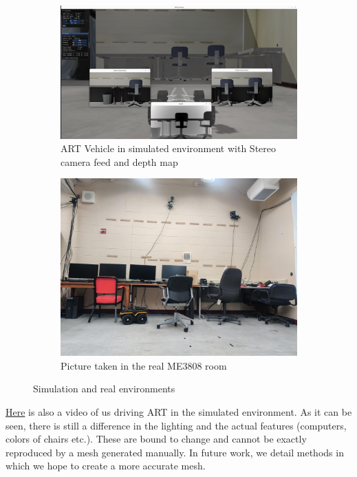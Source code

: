 \documentclass{article}
\begin{document}
\begin{figure}[htbp]
    \centering
    \begin{subfigure}[b]{0.45\textwidth}
      \centering
      \includegraphics[width=\linewidth]{./images/sim.png}
      \caption{ART Vehicle in simulated environment with Stereo camera feed and depth map}
      \label{fig:sim}
    \end{subfigure}
    \hfill
    \begin{subfigure}[b]{0.45\textwidth}
      \centering
      \includegraphics[width=\linewidth]{./images/real.jpeg}
      \caption{Picture taken in the real ME3808 room}
      \label{fig:real}
    \end{subfigure}
    \caption{Simulation and real environments}
    \label{fig:sim2real}
  \end{figure}

\href{https://uwmadison.box.com/s/6fg0vdrrqs0u74fcvunobefagvzrdkbu}{Here} is also a video of us driving ART in the simulated environment. As it can be seen, there is still a difference in the lighting and the actual features (computers, colors of chairs etc.). These are bound to change and cannot be exactly reproduced by a mesh generated manually. In future work, we detail methods in which we hope to create a more accurate mesh. 
\end{document}
